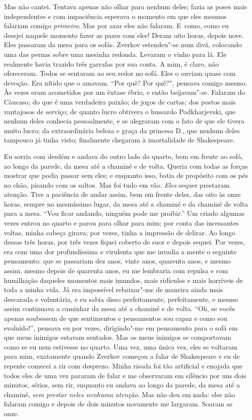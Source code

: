 Mas não cantei. Tentava apenas não olhar para nenhum deles; fazia as
poses mais independentes e com impaciência esperava o momento em que
eles mesmos falariam comigo \textit{primeiro}. Mas por azar eles não
falaram. \mbox{E como}, como eu desejei naquele momento fazer as pazes com
eles! Deram oito horas, depois nove. Eles passaram da mesa para os
sofás. Zverkov estendeu"-se num divã, colocando uma das pernas sobre uma
mesinha redonda. Levaram o vinho para lá. Ele realmente havia trazido
três garrafas por sua conta. A mim, é claro, não ofereceram. Todos se
sentaram ao seu redor no sofá. Eles o ouviam quase com devoção. Era
nítido que o amavam. “Por quê? Por quê?”, pensava comigo mesmo. Às
vezes eram acometidos por um êxtase ébrio, e então beijavam"-se. Falaram
do Cáucaso; do que é uma verdadeira paixão; de jogos de cartas; dos
postos mais vantajosos de serviço; de quanto lucro obtivera o hussardo
Podkharjevski, que nenhum deles conhecia pessoalmente, e se alegraram
com o fato de que ele tivera muito lucro; da extraordinária beleza e
graça da princesa D., que nenhum deles tampouco já tinha visto;
finalmente chegaram à imortalidade de Shakespeare.

Eu sorria com desdém e andava do outro lado do quarto, bem em frente ao sofá,
ao longo da parede, da mesa até a chaminé e de volta. Queria com todas as
forças mostrar que podia passar sem eles; e enquanto isso, batia de propósito
com os pés no chão, pisando com os saltos. Mas foi tudo em vão. \textit{Eles}
sequer prestaram atenção. Tive a paciência de andar assim, bem em frente deles,
das oito às onze horas, sempre no mesmíssimo lugar, da mesa até a chaminé e da
chaminé de volta para a mesa. “Vou ficar andando, ninguém pode me proibir.” Um
criado algumas vezes entrou no quarto e parou para olhar para mim; por conta
das incessantes voltas, minha cabeça girava; por vezes, tinha a impressão de
delirar. Ao longo dessas três horas, por três vezes fiquei coberto de suor e
depois sequei. Por vezes, era com uma dor profundíssima e virulenta que me
invadia a mente o seguinte pensamento: que se passariam dez anos, vinte anos,
quarenta anos, e mesmo assim, mesmo depois de quarenta anos, eu me lembraria
com repulsa e com humilhação daqueles momentos mais imundos, mais ridículos e
mais horríveis de toda a minha vida. Já era impossível rebaixar"-me de maneira
ainda mais descarada e voluntária, e eu sabia disso perfeitamente,
perfeitamente, e mesmo assim continuava a caminhar da mesa até a chaminé e de
volta.  “Oh, se vocês apenas soubessem de que sentimentos e pensamentos sou
capaz e como sou evoluído!”, pensava eu por vezes, dirigindo"-me em pensamento
para o sofá em que meus inimigos estavam sentados. Mas os meus inimigos se
comportavam como se eu nem estivesse no quarto. Uma vez, uma única vez, eles se
voltaram para mim, exatamente quando Zverkov começou a falar de Shakespeare e
eu de repente comecei a rir com desprezo. Minha risada foi tão artificial e
enojada que todos eles de uma vez pararam de falar e me observaram em silêncio
por uns dois minutos, sérios, sem rir, enquanto eu andava ao longo da parede,
da mesa até a chaminé, \textit{sem prestar neles nenhuma atenção}.  Mas não deu
em nada: eles não falaram comigo e depois de dois minutos novamente me
largaram. Soaram as onze.

